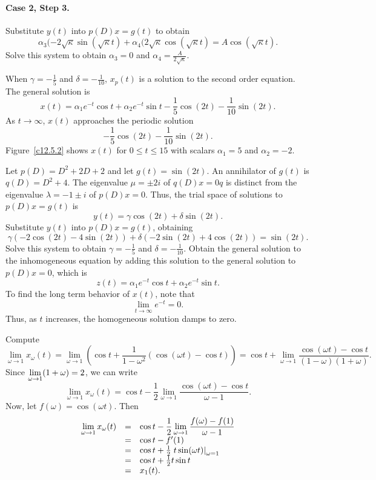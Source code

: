 \documentclass{ximera}
\begin{document}
\paragraph{Case 2, Step 3.} Substitute $y(t)$ into $p(D)x = g(t)$ to obtain
\[
\alpha_3(-2\sqrt{\kappa}\sin(\sqrt{\kappa}t) +
\alpha_4(2\sqrt{\kappa}\cos(\sqrt{\kappa}t)
= A\cos(\sqrt{\kappa}t).
\]
Solve this system to obtain $\alpha_3 = 0$ and
$\alpha_4 = \frac{A}{2\sqrt{\kappa}}$.


 \ans When $\gamma = -\frac{1}{5}$ and $\delta = -\frac{1}{10}$,
$x_p(t)$ is a solution to the second order equation.  The general solution
is
\[
x(t) = \alpha_1e^{-t}\cos t + \alpha_2e^{-t}\sin t
- \frac{1}{5}\cos(2t) - \frac{1}{10}\sin(2t).
\]
As $t \rightarrow \infty$, $x(t)$ approaches the periodic solution
\[
- \frac{1}{5}\cos(2t) - \frac{1}{10}\sin(2t).
\]
Figure~\ref{c12.5.2} shows $x(t)$ for $0 \leq t \leq 15$ with scalars
$\alpha_1 = 5$ and $\alpha_2 = -2$.

\soln Let $p(D) = D^2 + 2D + 2$ and let $g(t) = \sin(2t)$.  An annihilator
of $g(t)$ is $q(D) = D^2 + 4$.  The eigenvalue $\mu = \pm 2i$ of
$q(D)x = 0q$ is distinct from the eigenvalue $\lambda = -1 \pm i$ of
$p(D)x = 0$.  Thus, the trial space of solutions to $p(D)x = g(t)$ is
\[
y(t) = \gamma\cos(2t) + \delta\sin(2t).
\]
Substitute $y(t)$ into $p(D)x = g(t)$, obtaining
\[
\gamma(-2\cos(2t) - 4\sin(2t)) + \delta(-2\sin(2t) + 4\cos(2t)) = \sin(2t).
\]
Solve this system to obtain $\gamma = -\frac{1}{5}$ and
$\delta = -\frac{1}{10}$.  Obtain the general solution to the inhomogeneous
equation by adding this solution to the general solution to $p(D)x = 0$,
which is
\[
z(t) = \alpha_1e^{-t}\cos t + \alpha_2e^{-t}\sin t.
\]
To find the long term behavior of $x(t)$, note that
\[
\lim_{t \rightarrow \infty}e^{-t} = 0.
\]
Thus, as $t$ increases, the homogeneous solution damps to zero. 

\begin{figure}[htb]
                       \centerline{%
                       }
\end{figure}


Compute
\[
\lim_{\omega \rightarrow 1} x_\omega(t) =
\lim_{\omega \rightarrow 1}\left(\cos t + \frac{1}{1 - \omega^2}
(\cos(\omega t) - \cos t)\right) =
\cos t + \lim_{\omega \rightarrow 1}\frac{\cos(\omega t) - \cos t}
{(1 - \omega)(1 + \omega)}.
\]
Since $\displaystyle \lim_{\omega \rightarrow 1}(1 + \omega) = 2$, we can write
\[
\lim_{\omega \rightarrow 1} x_\omega(t) =
\cos t - \frac{1}{2}\lim_{\omega \rightarrow 1}
\frac{\cos(\omega t) - \cos t}{\omega - 1}.
\]
Now, let $f(\omega) = \cos(\omega t)$.  Then
\[
\begin{array}{rcl}
\displaystyle \lim_{\omega \rightarrow 1} x_\omega(t) & = &
\cos t - \displaystyle \frac{1}{2}\lim_{\omega \rightarrow 1}
\frac{f(\omega) - f(1)}{\omega - 1} \\
& = & \cos t - f'(1) \\
& = & \cos t + \frac{1}{2}\left.t\sin(\omega t)\right|_{\omega = 1} \\
& = & \cos t + \frac{1}{2}t\sin t \\
& = & x_1(t).
\end{array}
\]
\end{document}
